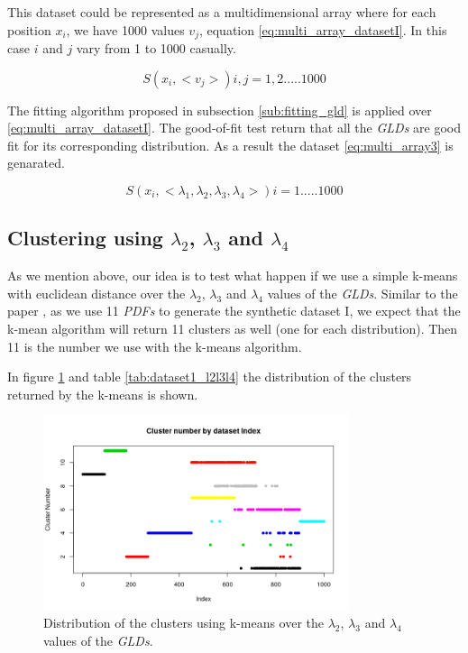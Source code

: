 This dataset could be represented as a multidimensional array where for each position $x_{i}$, we have 1000 values $v_{j}$, equation \ref{eq:multi_array_datasetI}. In this case $i$ and $j$ vary from 1 to 1000 casually.

\begin{equation}\label{eq:multi_array_datasetI}
S(x_{i}, <v_{j}>) i,j=1, 2.....1000
\end{equation}

The fitting algorithm proposed in subsection \ref{sub:fitting_gld} is applied over \ref{eq:multi_array_datasetI}. The good-of-fit test return that all the \textit{GLDs} are good fit for its corresponding distribution. As a result the dataset \ref{eq:multi_array3} is genarated. 

\begin{equation}\label{eq:multi_array3}
S(x_{i}, <\lambda_{1},\lambda_{2},\lambda_{3},\lambda_{4}>)  i=1.....1000
\end{equation}

\subsection{Clustering using $\lambda_{2}$, $\lambda_{3}$ and $\lambda_{4}$}\label{syntheticI_l234}

As we mention above, our idea is to test what happen if we use a simple k-means with euclidean distance over the $\lambda_{2}$, $\lambda_{3}$ and $\lambda_{4}$ values of the \textit{GLDs}. Similar to the paper \cite{Jiang2011}, as we use 11 \textit{PDFs} to generate the synthetic dataset I, we expect that the k-mean algorithm will return 11 clusters as well (one for each distribution). Then 11 is the number we use with the k-means algorithm.

In figure \ref{fig:dataset1_l2l3l4} and table \ref{tab:dataset1_l2l3l4} the distribution of the clusters returned by the k-means is shown.

\begin{figure}[H]
    \centering
    \includegraphics[width=0.8\textwidth]{img/gld_clustering/Dataset1/l2_l3_l4/intento_3/normal_exponential_uniform3.png}
    \caption{Distribution of the clusters using k-means over the $\lambda_{2}$, $\lambda_{3}$ and $\lambda_{4}$ values of the \textit{GLDs}.}
    \label{fig:dataset1_l2l3l4}
\end{figure}

